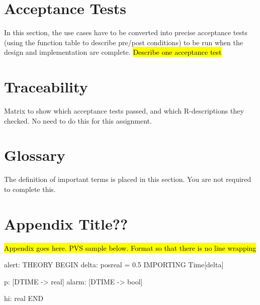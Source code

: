 \documentclass[fontsize=12pt,paper=letter,twoside]{scrartcl}
\begin{document}
\newpage
\section{Acceptance Tests}

In this section, the use cases have to be converted into precise acceptance tests (using the function table to describe pre/post conditions) to be run when the design and implementation are complete. \hl{Describe one acceptance test}

\newpage
\section{Traceability}

Matrix to show which acceptance tests passed, and which R-descriptions they checked. No need to do this for this assignment. 


\section{Glossary}

The definition of important terms is placed in this section. You are not required to complete this.



\newpage
\appendix

\section{Appendix Title??}
\hl{Appendix goes here. PVS sample below. Format so that there is no line wrapping}

\begin{pvs}
alert: THEORY
BEGIN
  delta: posreal = 0.5 %
  IMPORTING Time[delta]

  p:     [DTIME -> real]  %
  alarm: [DTIME -> bool]

  hi: real
END 	
\end{pvs}
\end{document}
